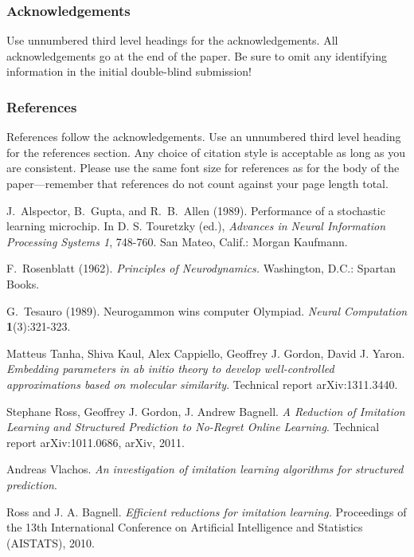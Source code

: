 \documentclass[twoside]{article}
\begin{document}
\subsubsection*{Acknowledgements}

Use unnumbered third level headings for the acknowledgements.  All
acknowledgements go at the end of the paper.  Be sure to omit any
identifying information in the initial double-blind submission!


\subsubsection*{References}

References follow the acknowledgements.  Use an unnumbered third level
heading for the references section.  Any choice of citation style is
acceptable as long as you are consistent.  Please use the same font
size for references as for the body of the paper---remember that
references do not count against your page length total.

J.~Alspector, B.~Gupta, and R.~B.~Allen (1989). Performance of a
stochastic learning microchip.  In D. S. Touretzky (ed.), {\it
  Advances in Neural Information Processing Systems 1}, 748-760.  San
Mateo, Calif.: Morgan Kaufmann.

F.~Rosenblatt (1962). {\it Principles of Neurodynamics.} Washington,
D.C.: Spartan Books.

G.~Tesauro (1989). Neurogammon wins computer Olympiad.  {\it Neural
  Computation} {\bf 1}(3):321-323.

\begin{thebibliography}{9}
  Matteus Tanha, Shiva Kaul, Alex Cappiello, Geoffrey J. Gordon, David J. Yaron.
  \emph{Embedding parameters in ab initio theory to develop well-controlled approximations based on molecular similarity}.
  Technical report arXiv:1311.3440.
  
  Stephane Ross, Geoffrey J. Gordon, J. Andrew Bagnell.
  \emph{A Reduction of Imitation Learning and Structured Prediction to No-Regret Online Learning}.
  Technical report arXiv:1011.0686, arXiv, 2011.
  
  Andreas Vlachos.
  \emph{An investigation of imitation learning algorithms for structured prediction}.
  
    Ross and J. A. Bagnell.
  \emph{Efficient reductions for imitation
learning.} Proceedings of the 13th International
Conference on Artificial Intelligence and Statistics (AISTATS),
2010.
  
\end{thebibliography}
\end{document}
